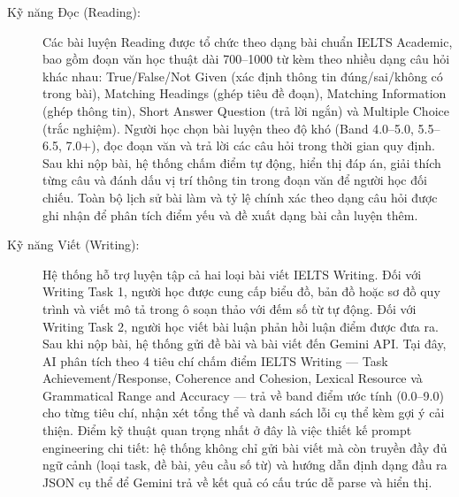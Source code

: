 \documentclass[a4paper,12pt]{extreport}
\begin{document}
\begin{description}
    \item[Kỹ năng Đọc (Reading):] Các bài luyện Reading được tổ chức theo dạng bài chuẩn IELTS Academic, bao gồm đoạn văn học thuật dài 700–1000 từ kèm theo nhiều dạng câu hỏi khác nhau: True/False/Not Given (xác định thông tin đúng/sai/không có trong bài), Matching Headings (ghép tiêu đề đoạn), Matching Information (ghép thông tin), Short Answer Question (trả lời ngắn) và Multiple Choice (trắc nghiệm). Người học chọn bài luyện theo độ khó (Band 4.0–5.0, 5.5–6.5, 7.0+), đọc đoạn văn và trả lời các câu hỏi trong thời gian quy định. Sau khi nộp bài, hệ thống chấm điểm tự động, hiển thị đáp án, giải thích từng câu và đánh dấu vị trí thông tin trong đoạn văn để người học đối chiếu. Toàn bộ lịch sử bài làm và tỷ lệ chính xác theo dạng câu hỏi được ghi nhận để phân tích điểm yếu và đề xuất dạng bài cần luyện thêm.

    \item[Kỹ năng Viết (Writing):] Hệ thống hỗ trợ luyện tập cả hai loại bài viết IELTS Writing. Đối với Writing Task 1, người học được cung cấp biểu đồ, bản đồ hoặc sơ đồ quy trình và viết mô tả trong ô soạn thảo với đếm số từ tự động. Đối với Writing Task 2, người học viết bài luận phản hồi luận điểm được đưa ra. Sau khi nộp bài, hệ thống gửi đề bài và bài viết đến Gemini API. Tại đây, AI phân tích theo 4 tiêu chí chấm điểm IELTS Writing — Task Achievement/Response, Coherence and Cohesion, Lexical Resource và Grammatical Range and Accuracy — trả về band điểm ước tính (0.0–9.0) cho từng tiêu chí, nhận xét tổng thể và danh sách lỗi cụ thể kèm gợi ý cải thiện. Điểm kỹ thuật quan trọng nhất ở đây là việc thiết kế prompt engineering chi tiết: hệ thống không chỉ gửi bài viết mà còn truyền đầy đủ ngữ cảnh (loại task, đề bài, yêu cầu số từ) và hướng dẫn định dạng đầu ra JSON cụ thể để Gemini trả về kết quả có cấu trúc dễ parse và hiển thị.
\end{description}
\end{document}

